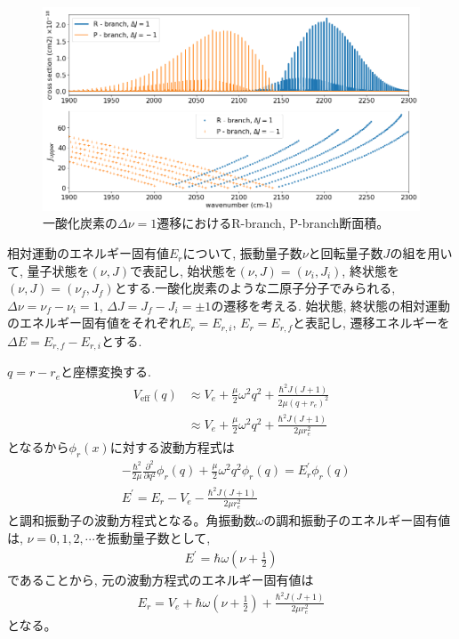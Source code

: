 
\begin{figure}
    \centering
    \includegraphics[width=\linewidth]{fig/branch_13_0.png}
    \caption{一酸化炭素の$\Delta \nu=1$遷移におけるR-branch, P-branch断面積。}
    \label{fig:rpbranchco}
\end{figure}


相対運動のエネルギー固有値$E_r$について, 振動量子数$\nu$と回転量子数$J$の組を用いて, 量子状態を$(\nu,J)$で表記し, 始状態を$(\nu,J) = (\nu_i, J_i)$, 終状態を$(\nu,J) = (\nu_f, J_f)$とする.一酸化炭素のような二原子分子でみられる, $\Delta \nu = \nu_f - \nu_i = 1$, $\Delta J = J_f - J_i = \pm 1$の遷移を考える. 始状態, 終状態の相対運動のエネルギー固有値をそれぞれ$E_r = E_{r, i}$, $E_r = E_{r, f}$と表記し, 遷移エネルギーを$\Delta E = E_{r, f} - E_{r, i}$とする.  

$q=r - r_e$と座標変換する.
\begin{align}
\label{eq:vpotent}
V_\mathrm{eff} (q) &\approx V_e + \frac{\mu}{2} \omega^2 q^2 + \frac{\hbar^2 J(J+1)}{2 \mu (q + r_e)^2} \\
 &\approx V_e + \frac{\mu}{2} \omega^2 q^2 + \frac{\hbar^2 J(J+1)}{2 \mu  r_e^2} 
\end{align}
となるから$\phi_r(x)$に対する波動方程式は
\begin{align}
  &- \frac{\hbar^2}{2 \mu} \frac{\partial^2}{\partial q^2} \phi_r(q) + \frac{\mu}{2} \omega^2 q^2 \phi_r(q) = E^\prime_r \phi_r(q) \\
  &E^\prime = E_r - V_e - \frac{\hbar^2 J(J+1)}{2 \mu r_e^2}
\end{align}
と調和振動子の波動方程式となる。角振動数$\omega$の調和振動子のエネルギー固有値は, $\nu=0, 1, 2, \cdots$を振動量子数として, 
\begin{align}
  E^\prime = \hbar \omega \left( \nu + \frac{1}{2} \right) 
\end{align}
であることから, 元の波動方程式のエネルギー固有値は
\begin{align}
E_r = V_e + \hbar \omega \left( \nu + \frac{1}{2} \right) + \frac{\hbar^2 J(J+1)}{2 \mu r_e^2}
\end{align}
となる。


